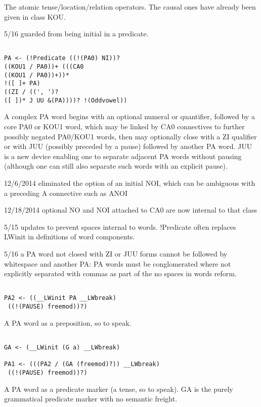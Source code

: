 \documentclass[12pt]{article}
\begin{document}
The atomic tense/location/relation operators.  The causal ones have already been
given in class KOU.

5/16 guarded from being initial in a predicate.

\begin{verbatim}

PA <- (!Predicate ((!(PA0) NI))?  
((KOU1 / PA0))+ (((CA0
((KOU1 / PA0))+))* 
!([ ]+ PA)
((ZI / ((', ')? 
([ ])* J UU &(PA))))? !(Oddvowel))

\end{verbatim}

A complex PA word begins with an optional numeral or quantifier, followed
by a core PA0 or KOU1 word, which may be linked by CA0 connectives to further possibly negated PA0/KOU1 words,
then may optionally close with a ZI qualifier or with JUU (possibly preceded by a pause) followed by another PA word.
JUU is a new device enabling one to separate adjacent PA words without pausing (although one can still also separate
such words with an explicit pause).

12/6/2014 eliminated the option of an initial NOI, which can be ambiguous with a preceding A connective such as ANOI

12/18/2014  optional NO and NOI attached to CA0 are now internal to that class

5/15 updates to prevent spaces internal to words.  !Predicate often replaces LWinit in definitions of word components.

5/16 a PA word not closed with ZI or JUU forms cannot be followed by whitespace and another PA:  PA words
must be conglomerated where not explicitly separated with commas as part of the no spaces in words reform.

\begin{verbatim}

PA2 <- ((__LWinit PA __LWbreak)
 ((!(PAUSE) freemod))?)

\end{verbatim}

A PA word as a preposition, so to speak.

\begin{verbatim}

GA <- (__LWinit (G a) __LWbreak)

PA1 <- (((PA2 / (GA (freemod)?)) __LWbreak)
 ((!(PAUSE) freemod))?)

\end{verbatim}

A PA word as a predicate marker (a tense, so to speak).  GA is the purely grammatical predicate marker with no semantic freight.
\end{document}
